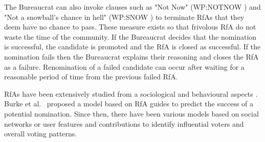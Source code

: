 The Bureaucrat can also invoke clauses such as "Not Now" (WP:NOTNOW \cite{wiki:wp:notnow}) and "Not a snowball's chance in hell" (WP:SNOW \cite{wiki:wp:snow}) to terminate RfAs that they deem have no chance to pass. These measure exists so that frivolous RfA do not waste the time of the community. If the Bureaucrat decides that the nomination is successful, the candidate is promoted and the RfA is closed as successful. If the nomination fails then the Bureaucrat explains their reasoning and closes the RfA as a failure. Renomination of a failed candidate can occur after waiting for a reasonable period of time from the previous failed RfA.

RfAs have been extensively studied from a sociological and behavioural aspects \cite{derthick2011collaborative,kordzadeh2016revisiting}. Burke et al.\ \cite{burke2008mopping} proposed a model based on RfA guides to predict the success of a potential nomination. Since then, there have been various models based on social networks  \cite{putzke2017stated,cabunducan2011voting,picot-clemente2015social} or user features and contributions \cite{clemente2015contribution,asim2018personal} to identify influential voters and overall voting patterns. 

